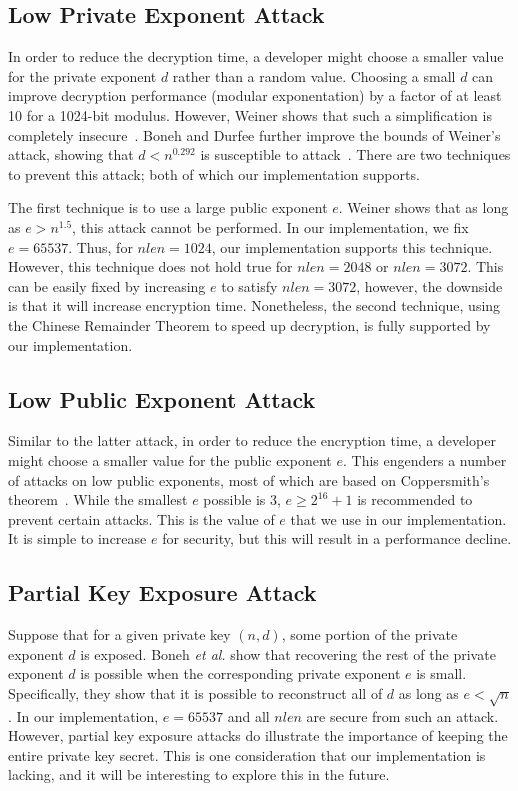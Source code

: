 \documentclass[letterpaper]{article}
\begin{document}
\subsection{Low Private Exponent Attack}
In order to reduce the decryption time, a developer might choose a smaller value for the private exponent $d$ rather than a random value. Choosing a small $d$ can improve decryption performance (modular exponentation) by a factor of at least 10 for a 1024-bit modulus. However, Weiner shows that such a simplification is completely insecure~\cite{wiener1990cryptanalysis}. Boneh and Durfee further improve the bounds of Weiner's attack, showing that $d <
n^{0.292}$ is susceptible to attack~\cite{boneh2000new}. There are two techniques to prevent this attack; both of which our implementation supports. 

The first technique is to use a large public exponent $e$. Weiner shows that as long as $e > n^{1.5}$, this attack cannot be performed. In our implementation, we fix $e = 65537$. Thus, for $nlen = 1024$, our implementation supports this technique. However, this technique does not hold true for $nlen = 2048$ or $nlen = 3072$. This can be easily fixed by increasing $e$ to satisfy $nlen = 3072$, however, the downside is that it will increase encryption time. Nonetheless, the second technique, using
the Chinese Remainder Theorem to speed up decryption, is fully supported by our implementation.

\subsection{Low Public Exponent Attack}

Similar to the latter attack, in order to reduce the encryption time, a developer might choose a smaller value for the public exponent $e$. This engenders a number of attacks on low public exponents, most of which are based on Coppersmith's theorem~\cite{coppersmith1997small}. While the smallest $e$ possible is 3, $e \geq 2^{16} + 1$ is recommended to prevent certain attacks. This is the value of $e$ that we use in our implementation. It is simple to increase $e$ for security, but this will result in a performance decline.

\subsection{Partial Key Exposure Attack}

Suppose that for a given private key $(n,d)$, some portion of the private exponent $d$ is exposed. Boneh \emph{et al.} show that recovering the rest of the private exponent $d$ is possible when the corresponding private exponent $e$ is small. Specifically, they show that it is possible to reconstruct all of $d$ as long as $e < \sqrt{n}$. In our implementation, $e = 65537$ and all $nlen$ are secure from such an attack. However, partial key exposure attacks do illustrate the importance
of keeping the entire private key secret. This is one consideration that our implementation is lacking, and it will be interesting to explore this in the future.
\end{document}
